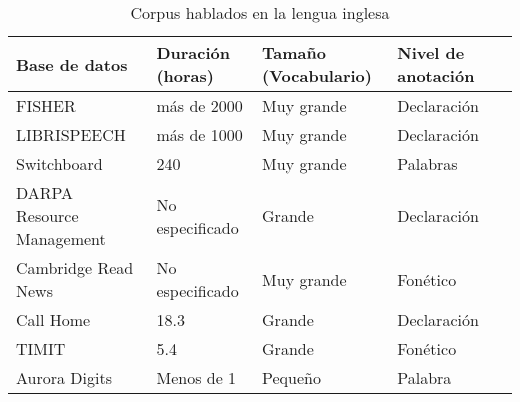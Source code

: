 \begin{table}[H]
\centering
\caption{Corpus hablados en la lengua inglesa}
\label{tab:english_corpora}
\begin{tabular}{|l|l|l|l|l|}
\toprule
\textbf{Base de datos} & \textbf{Duración (horas)} & \textbf{Tamaño (Vocabulario)} & \textbf{Nivel de anotación}\\
\hline
FISHER\cite{CieriTheSpeech-to-Text}  & más de 2000 & Muy grande &  Declaración\\
\hline
LIBRISPEECH\cite{PanayotovLIBRISPEECH:BOOKS}  & más de 1000 & Muy grande &  Declaración\\
\hline

Switchboard \cite{Godfrey1992SWITCHBOARD:Development}  & 240 & Muy grande & Palabras\\
\hline
DARPA Resource Management \cite{Lucke1992ExpandingCorpus} & No especificado  & Grande & Declaración \\
\hline
Cambridge Read News \cite{RobinsonWSJCAM0:RECOGNITION}  & No especificado & Muy grande & Fonético\\
\hline
Call Home  \cite{Fu-HuaLiuSpeechCorpus} & 18.3 & Grande & Declaración\\
\hline
TIMIT \cite{PriceTheRecognition} & 5.4 & Grande & Fonético \\
\hline
Aurora Digits \cite{EvansEfficientCorpus}  & Menos de 1 & Pequeño & Palabra\\
\hline



\end{tabular}
\end{table}